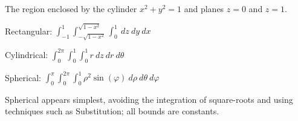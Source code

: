 {The region enclosed by the cylinder $x^2+y^2=1$ and planes $z=0$ and $z=1$.
}
{Rectangular: $\int_{-1}^{1}\int_{-\sqrt{1-x^2}}^{\sqrt{1-x^2}}\int_{0}^{1}\ dz\ dy\ dx$

Cylindrical: $\int_0^{2\pi}\int_0^1\int_{0}^{1}r\ dz\ dr\ d\theta$

Spherical: $\int_0^\pi\int_0^{2\pi}\int_0^1 \rho^2\sin(\varphi)\ d\rho\ d\theta\ d\varphi$

Spherical appears simplest, avoiding the integration of square-roots and using techniques such as Substitution; all bounds are constants.
}
